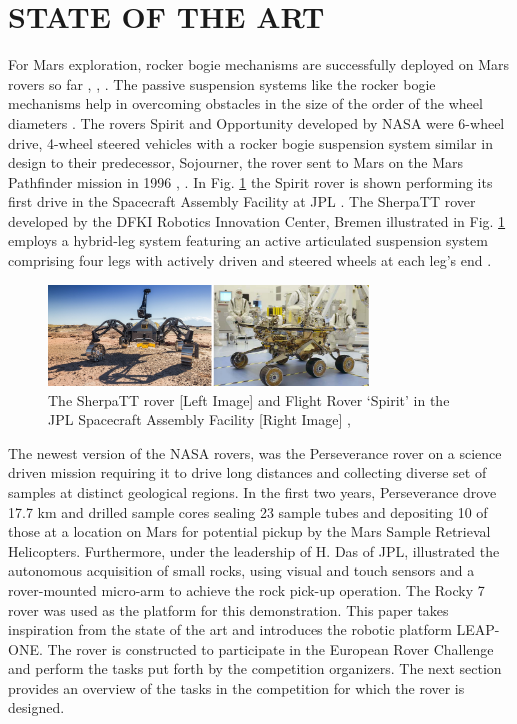 \documentclass[letterpaper, 10 pt, conference]{ieeeconf}  %
\begin{document}
\section{STATE OF THE ART}
For Mars exploration, rocker bogie mechanisms are successfully deployed on Mars rovers so far \cite{b1}, \cite{b2}, \cite{b3}. The passive suspension systems like the rocker bogie mechanisms help in overcoming obstacles in the size of the order of the wheel diameters \cite{sherpasus}. The rovers Spirit and Opportunity developed by NASA were 6-wheel drive, 4-wheel steered vehicles with a rocker bogie suspension system similar in design to their predecessor, Sojourner, the rover sent to Mars on the Mars Pathfinder mission in 1996 \cite{b1}, \cite{b4}. In Fig. \ref{spirit-sherpa} the Spirit rover is shown performing its first drive in the Spacecraft Assembly Facility at JPL \cite{b1}. The SherpaTT rover developed by the DFKI Robotics Innovation Center, Bremen illustrated in Fig. \ref{spirit-sherpa} employs a hybrid-leg system featuring an active articulated suspension system comprising four legs with actively driven and steered wheels at each leg's end \cite{sherpasus}.  
    \begin{figure}[htbp]
    \centerline{\includegraphics[width=85mm]{Sprirt-sherpa.png}}
    \caption{The SherpaTT rover [Left Image] and Flight Rover ‘Spirit’ in the JPL Spacecraft Assembly Facility [Right Image] \cite{sherpasus}, \cite{b2}}
    \label{spirit-sherpa}
    \end{figure}

The newest version of the NASA rovers, was the Perseverance rover on a science driven mission requiring it to drive long distances and collecting diverse set of samples at distinct geological regions. In the first two years, Perseverance drove 17.7 km and drilled sample cores sealing 23 sample tubes and depositing 10 of those at a location on Mars for potential pickup by the Mars Sample Retrieval Helicopters. \cite{b5} Furthermore, under the leadership of H. Das of JPL, \cite{b6} illustrated the autonomous acquisition of small rocks, using visual and touch sensors and a rover-mounted micro-arm to achieve the rock pick-up operation. The Rocky 7 rover \cite{b7} was used as the platform for this demonstration. This paper takes inspiration from the state of the art and introduces the robotic platform LEAP-ONE. The rover is constructed to participate in the European Rover Challenge and perform the tasks put forth by the competition organizers. The next section provides an overview of the tasks in the competition for which the rover is designed. 
\end{document}
